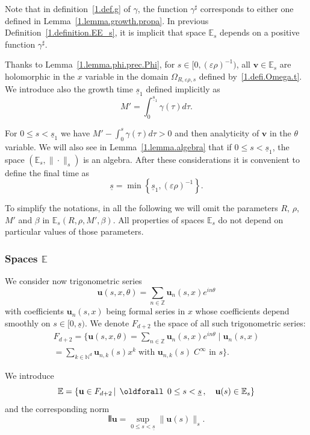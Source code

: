 \documentclass[AHL,Unicode,longabstracts,published]{cedram}
\theoremstyle{plain}
\newcommand*\e{\varepsilon}
\newcommand*\N{{\mathbb N}}
\newcommand*\Z{{\mathbb Z}}
\newcommand*\EE{{\mathbb E}}
\newcommand*\g{\gamma}
\newcommand{\ubf}{{\mathbf u}}
\newcommand{\vbf}{{\mathbf v}}
\newcommand*\und{\underline}
\DeclarePairedDelimiter{\VERT}{|\mkern -1.6mu|\mkern -1.6mu|}{|\mkern -1.6mu|\mkern -1.6mu|}
\renewcommand*{\forall}{\mathrel{\oldforall}}
\begin{document}
Note that in definition~\eqref{1.def.g} of $\g$, the function $\g^{\sharp}$ corresponds to either one defined in Lemma~\ref{1.lemma.growth.propa}. In previous Definition~\ref{1.definition.EE_s}, it is implicit that space $\EE_{s}$ depends on a positive function $\g^{\sharp}$.

Thanks to Lemma~\ref{1.lemma.phi.prec.Phi}, for $s\in[0,(\e\rho)^{-1})$, all $\vbf\in\EE_{s}$ are holomorphic in the $x$ variable in the domain $\Omega_{R,\e\rho,s}$ defined by~\eqref{1.defi.Omega.t}. We introduce also the growth time $\und{s}_1$ defined implicitly as 
\begin{equation}\label{1.def.und.s.1}
M' = \int_{0}^{\und{s}_1} \g(\tau) d\tau.
\end{equation}

For $0 \leq s < \und{s}_1$ we have $M' - \int_{0}^{s} \g(\tau)d\tau > 0$ and then analyticity of $\vbf$ in the $\theta$ variable. We will also see in Lemma~\ref{1.lemma.algebra} that if $0\leq s < \und{s}_1$, the space $(\EE_{s},\|\cdot\|_{s})$ is an algebra. After these considerations it is convenient to define the final time as
\begin{equation}\label{1.finaltime}
\und{s} = \min\left\{\und{s}_1, \left(\e\rho\right)^{-1}\right\}.
\end{equation}

To simplify the notations, in all the following we will omit the parameters $R$, $\rho$, $M'$ and $\beta$ in $\EE_{s}(R,\rho,M',\beta)$. All properties of spaces $\EE_{s}$ do not depend on particular values of those parameters.


\subsubsection{Spaces \texorpdfstring{$\EE$}{EE}}

We consider now trigonometric series
\[
\ubf(s,x,\theta) = \sum_{n\in\Z} \ubf_n(s,x) e^{in\theta}
\]
with coefficients $\ubf_n(s,x)$ being formal series in $x$ whose coefficients depend smoothly on $s\in[0,\und{s})$. We denote $F_{d+2}$ the space of all such trigonometric series:
\begin{multline*}
F_{d+2} = \bigg\{ \ubf(s,x,\theta) = \sum_{n\in\Z} \ubf_n(s,x) e^{in\theta} \;\Big|\; \ubf_n(s,x) \\
= \sum_{k\in\N^{d}} \ubf_{n,k}(s)x^{k} \; \text{with } \ubf_{n,k}(s) \;C^{\infty} \text{ in } s \bigg\}.
\end{multline*}

\begin{defi}[Spaces $\EE$]
We introduce
\begin{equation}\label{1.defi.space}
\EE = \left\{\ubf\in F_{d+2} \,|\, \forall \, 0\leq s <\und{s} \,, \quad \ubf(s)\in\EE_{s} \right\}
\end{equation}
and the corresponding norm
\begin{equation}\label{1.defi.norm}
\VERT{\ubf} = \sup_{0\leq s < \und{s}} \|\ubf(s)\|_s.
\end{equation}
\end{defi}
\end{document}
